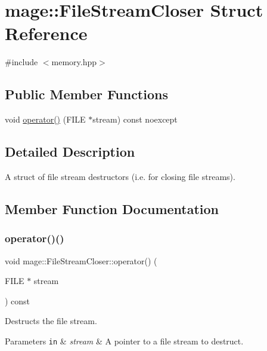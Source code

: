 \hypertarget{structmage_1_1_file_stream_closer}{}\section{mage\+:\+:File\+Stream\+Closer Struct Reference}
\label{structmage_1_1_file_stream_closer}


{\ttfamily \#include $<$memory.\+hpp$>$}

\subsection*{Public Member Functions}
\begin{DoxyCompactItemize}
\item 
void \mbox{\hyperlink{structmage_1_1_file_stream_closer_a87ef6007ca4e576a96f36c5fd003a386}{operator()}} (F\+I\+LE $\ast$stream) const noexcept
\end{DoxyCompactItemize}


\subsection{Detailed Description}
A struct of file stream destructors (i.\+e. for closing file streams). 

\subsection{Member Function Documentation}
\mbox{\label{structmage_1_1_file_stream_closer_a87ef6007ca4e576a96f36c5fd003a386}} 
\subsubsection{\texorpdfstring{operator()()}{operator()()}}
{\footnotesize\ttfamily void mage\+::\+File\+Stream\+Closer\+::operator() (\begin{DoxyParamCaption}\item[{F\+I\+LE $\ast$}]{stream }\end{DoxyParamCaption}) const\hspace{0.3cm}{\ttfamily [noexcept]}}

Destructs the file stream.


\begin{DoxyParams}[1]{Parameters}
\mbox{\tt in}  & {\em stream} & A pointer to a file stream to destruct. \\
\hline
\end{DoxyParams}
